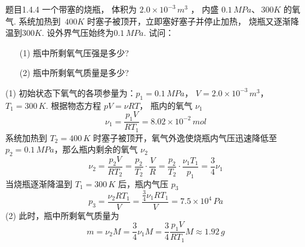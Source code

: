 \begin{question}{题目1.4.4}
    一个带塞的烧瓶， 体积为 $2.0 \times 10^{-3}\,\si{m^3}$ ， 内盛 $0.1\,\si{MPa}$、$\,\si{300K}$ 的氧气. 系统加热到 $\,\si{400 K}$ 时塞子被顶开，立即塞好塞子并停止加热， 烧瓶又逐渐降温到$\si{300K}$. 设外界气压始终为$0.1\,\si{MPa}$. 试问：
    \begin{itemize}
        \item[(1)] 瓶中所剩氧气压强是多少?
        \item[(2)] 瓶中所剩氧气质量是多少?
    \end{itemize}
\end{question}
\begin{solution}
    (1) 初始状态下氧气的各项参量为：$p_1= 0.1 \,\si{MPa}$， $V = 2.0 \times 10^{-3} \,\si{m^3}$，$T_1 = 300 \,\si{K}$. 根据物态方程 $pV = \nu RT$， 瓶内的氧气 $\nu_1$
    $$
        \nu_1 = \frac{p_1V}{RT_1} = 8.02 \times 10^{-2} \,\si{mol}
    $$
    系统加热到 $T_2 = 400 \,\si{K}$ 时塞子被顶开，氧气外逸使烧瓶内气压迅速降低至 $p_2 = 0.1 \,\si{MPa}$，那么瓶内剩余的氧气 $\nu_2$
    $$
        \nu_2 = \frac{p_2V}{RT_2}
        = \frac{p_2}{T_2} \cdot \frac{V}{R}
        = \frac{p_2}{T_2} \cdot \frac{\nu_1T_1}{p_1}
        = \frac{3}{4} \nu_1
    $$
    当烧瓶逐渐降温到 $T_1 = 300 \,\si{K}$ 后，瓶内气压 $p_3$
    $$
        p_3 = \dfrac{\nu_2RT_1}{V}
        = \dfrac{\frac{3}{4}\nu_1RT_1}{V}
        = 7.5\times10^4 \,\si{Pa}
    $$
    (2) 此时，瓶中所剩氧气质量为
    $$
        m = \nu_2 M
        = \frac{3}{4} \nu_1 M
        = \frac{3}{4} \frac{p_1V}{RT_1} M
        \approx 1.92 \,\si{g}
    $$
\end{solution}


